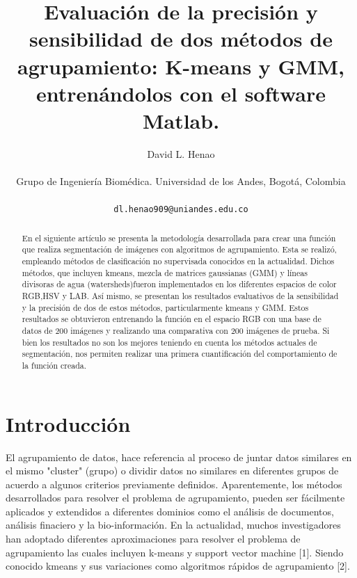 \documentclass[10pt,twocolumn,letterpaper]{article}
\begin{document}
\title{Evaluación de la precisión y sensibilidad de dos métodos de agrupamiento: K-means y GMM, entrenándolos con el software Matlab.}

\author{David L. Henao\\
\begin{normalsize}
Grupo de Ingeniería Biomédica. Universidad de los Andes, Bogotá, Colombia
\end{normalsize}
\\
{\tt\small dl.henao909@uniandes.edu.co}}
\maketitle

\begin{abstract}

En el siguiente artículo se presenta la metodología desarrollada para crear una función que realiza segmentación de imágenes con algoritmos de agrupamiento. Esta se realizó, empleando métodos de clasificación no supervisada conocidos en la actualidad. Dichos métodos, que incluyen kmeans, mezcla de matrices gaussianas (GMM) y líneas divisoras de agua (watersheds)fueron implementados en los diferentes espacios de color RGB,HSV y LAB. Así mismo, se presentan los resultados evaluativos de la sensibilidad y la precisión de dos de estos métodos, particularmente kmeans y GMM. Estos resultados se obtuvieron entrenando la función en el espacio RGB con una base de datos de 200 imágenes y realizando una comparativa con 200 imágenes de prueba. Si bien los resultados no son los mejores teniendo en cuenta los métodos actuales de segmentación, nos permiten realizar una primera cuantificación del comportamiento de la función creada.
   
\end{abstract}

\section{Introducción}

El agrupamiento de datos, hace referencia al proceso de juntar datos similares en el mismo "cluster" (grupo) o dividir datos no similares en diferentes grupos de acuerdo a algunos criterios previamente definidos. Aparentemente, los métodos desarrollados para resolver el problema de agrupamiento, pueden ser fácilmente aplicados y extendidos a diferentes dominios como el análisis de documentos, análisis finaciero y la bio-información. En la actualidad, muchos investigadores han adoptado diferentes aproximaciones para resolver el problema de agrupamiento las cuales incluyen k-means y support vector machine [1]. Siendo conocido kmeans y sus variaciones como algoritmos rápidos de agrupamiento [2].
\end{document}
